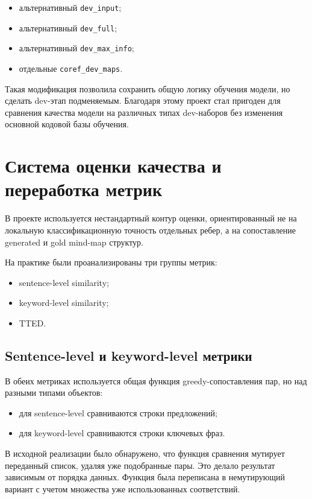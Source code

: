 \documentclass[12pt,a4paper]{article}
\begin{document}
\begin{itemize}
    \item альтернативный \texttt{dev\_input};
    \item альтернативный \texttt{dev\_full};
    \item альтернативный \texttt{dev\_max\_info};
    \item отдельные \texttt{coref\_dev\_maps}.
\end{itemize}

Такая модификация позволила сохранить общую логику обучения модели, но сделать dev-этап
подменяемым. Благодаря этому проект стал пригоден для сравнения качества модели на
различных типах dev-наборов без изменения основной кодовой базы обучения.

\section{Система оценки качества и переработка метрик}

В проекте используется нестандартный контур оценки, ориентированный не на локальную
классификационную точность отдельных ребер, а на сопоставление generated и gold mind-map
структур.

На практике были проанализированы три группы метрик:

\begin{itemize}
    \item sentence-level similarity;
    \item keyword-level similarity;
    \item TTED.
\end{itemize}

\subsection{Sentence-level и keyword-level метрики}

В обеих метриках используется общая функция greedy-сопоставления пар, но над разными
типами объектов:

\begin{itemize}
    \item для sentence-level сравниваются строки предложений;
    \item для keyword-level сравниваются строки ключевых фраз.
\end{itemize}

В исходной реализации было обнаружено, что функция сравнения мутирует переданный список,
удаляя уже подобранные пары. Это делало результат зависимым от порядка данных. Функция
была переписана в немутирующий вариант с учетом множества уже использованных
соответствий.
\end{document}
